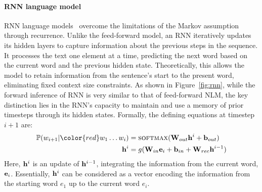 \paragraph{RNN language model} \ac{RNN} language models~\citep{elman1990finding,mikolov2010recurrent} overcome the limitations of the Markov assumption through recurrence. Unlike the feed-forward model, an RNN iteratively updates its hidden layers to capture information about the previous steps in the sequence. It processes the text one element at a time, predicting the next word based on the current word and the previous hidden state. Theoretically, this allows the model to retain information from the sentence's start to the present word, eliminating fixed context size constraints. As shown in Figure~\ref{fig:rnn}, while the forward inference of RNN is very similar to that of feed-forward NLM, the key distinction lies in the RNN's capacity to maintain and use a memory of prior timesteps through its hidden states. Formally, the defining equations at timestep $i+1$ are:
\begin{align}
      \mathbb{P}(w_{i+1}|{\color{red} w_{1}}\ldots w_{i}) &=
        \textsc{softmax}(\ivec{W}_{out}\ivec{h}^{i}+\ivec{b}_{out}) \nonumber\\
      \ivec{h}^{i} &= g( \ivec{W}_{in} \ivec{e}_{i} +\ivec{b}_{in} +\ivec{W}_{rec} \ivec{h}^{i-1}   )
\end{align}
\noindent Here, ${\mathbf h}^{i}$ is an update of ${\mathbf h}^{i-1}$, integrating the information from the current word, ${\mathbf e}_{i}$. Essentially, ${\mathbf h}^{i}$ can be considered as a vector encoding the information from the starting word $e_1$ up to the current word $e_i$.

